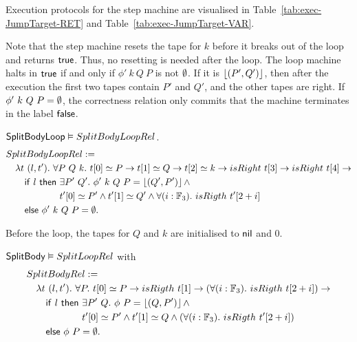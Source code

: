 Execution protocols for the step machine are visualised in Table~\ref{tab:exec-JumpTarget-RET} and Table~\ref{tab:exec-JumpTarget-VAR}.

Note that the step machine resets the tape for $k$ before it breaks out of the loop and returns $\mathsf{true}$.  Thus, no resetting is needed after the loop.
The loop machine halts in $\mathsf{true}$ if and only if $\phi'~k~Q~P$ is not $\emptyset$.  If it is $\left\lfloor {(P',Q')} \right\rfloor$, then after the execution the first two
tapes contain $P'$ and $Q'$, and the other tapes are right.  If $\phi'~k~Q~P = \emptyset$, the correctness relation only commits that the machine
terminates in the label $\mathsf{false}$.
\begin{lemma}
  $\mathsf{SplitBodyLoop} \mathrel{\vDash} SplitBodyLoopRel$.
  \begin{alignat*}{1}
    & SplitBodyLoopRel := \\
    &\quad \lambda t~(l, t').~\forall P~Q~k.~t[0] \simeq P \rightarrow t[1] \simeq Q \rightarrow t[2] \simeq k \rightarrow isRight~t[3] \rightarrow isRight~t[4] \rightarrow \\
    &\quad\quad \MS{if}~l~\MS{then}~\exists P'~Q'.~ \phi'~k~Q~P = \Some{(Q', P')} \land \\
    &\quad\quad \phantom{\MS{if}~l~\MS{then}}~t'[0] \simeq P' \land t'[1] \simeq Q' \land \forall(i:\Fin_3).~isRigth~t'[2+i] \\
    &\quad\quad \MS{else}~\phi'~k~Q~P=\None.
\end{alignat*}
\end{lemma}

Before the loop, the tapes for $Q$ and $k$ are initialised to $\mathsf{nil}$ and $0$.
\begin{lemma}
  $\mathsf{SplitBody} \mathrel{\vDash} SplitLoopRel$ with
  \begin{alignat*}{1}
    & SplitBodyRel := \\
    &\quad \lambda t~(l, t').~\forall P.~t[0] \simeq P \rightarrow isRigth~t[1] \rightarrow (\forall(i:\Fin_3).~isRigth~t[2+i]) \rightarrow \\
    &\quad\quad \MS{if}~l~\MS{then}~\exists P'~Q.~ \phi~P = \Some{(Q, P')} \land \\
    &\quad\quad \phantom{\MS{if}~l~\MS{then}}~t'[0] \simeq P' \land t'[1] \simeq Q \land \left(\forall(i:\Fin_3).~isRigth~t'[2+i]\right) \\
    &\quad\quad \MS{else}~\phi~P=\None.
\end{alignat*}
\end{lemma}


